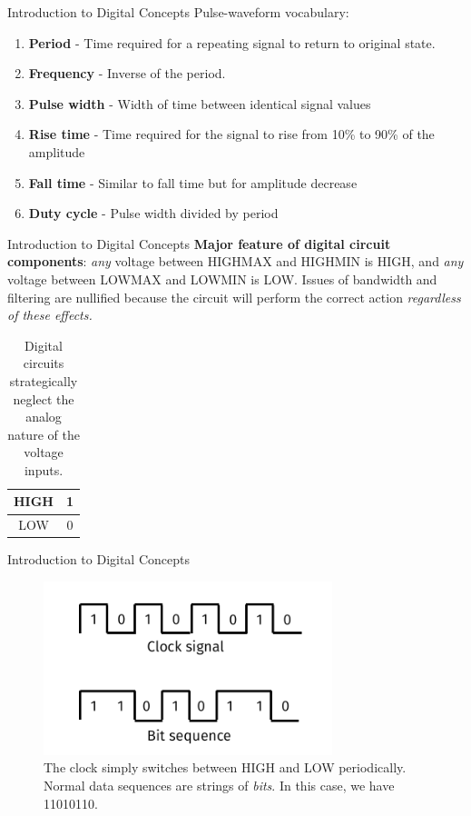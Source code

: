 \documentclass{beamer}
\begin{document}
\begin{frame}{Introduction to Digital Concepts}
\small
Pulse-waveform vocabulary:
\begin{enumerate}
\item \textbf{Period} - Time required for a repeating signal to return to original state.
\item \textbf{Frequency} - Inverse of the period.
\item \textbf{Pulse width} - Width of time between identical signal values
\item \textbf{Rise time} - Time required for the signal to rise from 10\% to 90\% of the amplitude
\item \textbf{Fall time} - Similar to fall time but for amplitude decrease
\item \textbf{Duty cycle} - Pulse width divided by period
\end{enumerate}
\end{frame}

\begin{frame}{Introduction to Digital Concepts}
\textbf{Major feature of digital circuit components}: \textit{any} voltage between HIGHMAX and HIGHMIN is HIGH, and \textit{any} voltage between LOWMAX and LOWMIN is LOW.  Issues of bandwidth and filtering are nullified because the circuit will perform the correct action \textit{regardless of these effects.} \\
\begin{table}
\centering
\begin{tabular}{c | c}
HIGH & 1 \\ \hline
LOW & 0 \\
\end{tabular}
\caption{\label{tab:highlow} Digital circuits strategically neglect the analog nature of the voltage inputs.}
\end{table}
\end{frame}

\begin{frame}{Introduction to Digital Concepts}
\begin{figure}
\centering
\includegraphics[width=0.75\textwidth]{figures/BitSequence.pdf}
\caption{\label{fig:bitsequence} The clock simply switches between HIGH and LOW periodically.  Normal data sequences are strings of \textit{bits}.  In this case, we have 11010110.}
\end{figure}
\end{frame}
\end{document}
